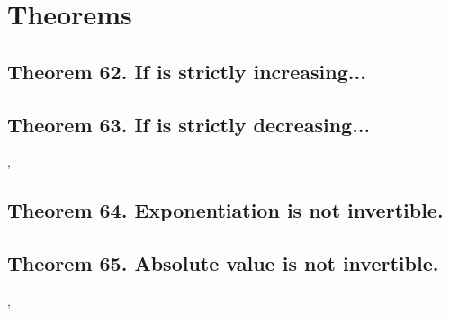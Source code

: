 \documentclass[preview]{standalone}
\begin{document}


\section{Theorems}


\subsection[\texorpdfstring{$\gamma [\alpha]$ is strictly increasing...}
        {If a function is strictly increasing...}
    ]{
        \color{section}Theorem 62. \color{black} If \bm{$\gamma [\alpha]$} is strictly increasing...
    }

\pagebreak


\subsection[\texorpdfstring{$\gamma [\alpha]$ is strictly decreasing...}
        {If a function is strictly decreasing...}
    ]{
        \color{section}Theorem 63. \color{black} If \bm{$\gamma [\alpha]$} is strictly decreasing...
    }

\sep


\subsection[Exponentiation is not invertible.]
    {
        \color{section}Theorem 64. \color{black} Exponentiation is not invertible.
    }

\pagebreak


\subsection[Absolute value is not invertible.]
    {
        \color{section}Theorem 65. \color{black} Absolute value is not invertible.
    }

\sep
\end{document}
